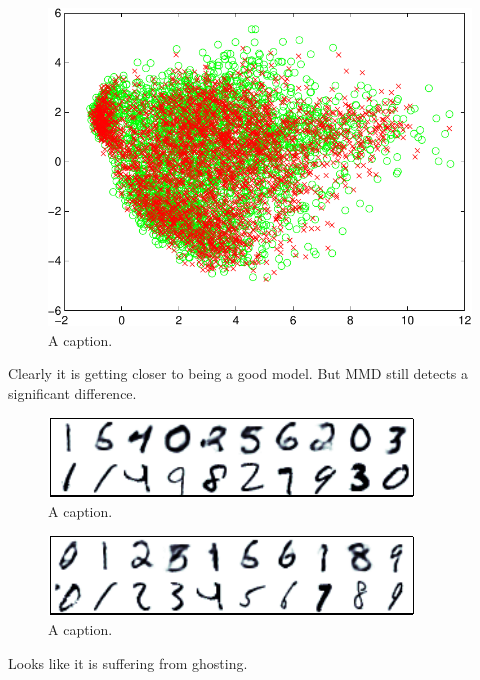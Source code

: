 \documentclass{article}
\begin{document}
\begin{figure}[ht]
\centering
\includegraphics[width=0.98\columnwidth]{figures/dbn_ft_pca}
\caption{
A caption.
}
\label{fig:dbn_ft_pca}
\end{figure}

Clearly it is getting closer to being a good model.
But MMD still detects a significant difference.

\begin{figure}[ht]
\centering
\includegraphics[width=0.98\columnwidth]{figures/dbn_ft_witness_peaks}
\caption{
A caption.
}
\label{fig:dbn_ft_witness_peaks}
\end{figure}

\begin{figure}[ht]
\centering
\includegraphics[width=0.98\columnwidth]{figures/dbn_ft_cond}
\caption{
A caption.
}
\label{fig:dbn_ft_cond}
\end{figure}

Looks like it is suffering from ghosting.
\end{document}
